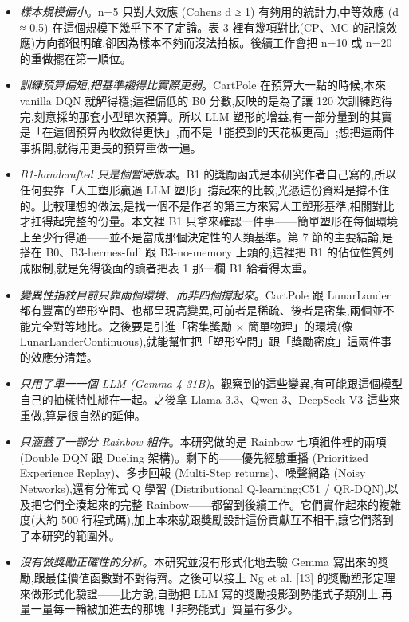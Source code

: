 \begin{itemize}
\tightlist
\item
  \emph{樣本規模偏小}。n=5 只對大效應 (Cohen\textquotesingle s d ≥ 1) 有夠用的統計力,中等效應 (d ≈ 0.5) 在這個規模下幾乎下不了定論。表 3 裡有幾項對比(CP、MC 的記憶效應)方向都很明確,卻因為樣本不夠而沒法拍板。後續工作會把 n=10 或 n=20 的重做擺在第一順位。
\item
  \emph{訓練預算偏短,把基準襯得比實際更弱}。CartPole 在預算大一點的時候,本來 vanilla DQN 就解得穩;這裡偏低的 B0 分數,反映的是為了讓 120 次訓練跑得完,刻意採的那套小型單次預算。所以 LLM 塑形的增益,有一部分量到的其實是「在這個預算內收斂得更快」,而不是「能摸到的天花板更高」;想把這兩件事拆開,就得用更長的預算重做一遍。
\item
  \emph{B1-handcrafted 只是個暫時版本}。B1 的獎勵函式是本研究作者自己寫的,所以任何要靠「人工塑形贏過 LLM 塑形」撐起來的比較,光憑這份資料是撐不住的。比較理想的做法,是找一個不是作者的第三方來寫人工塑形基準,相關對比才扛得起完整的份量。本文裡 B1 只拿來確認一件事------簡單塑形在每個環境上至少行得通------並不是當成那個決定性的人類基準。第 7 節的主要結論,是搭在 B0、B3-hermes-full 跟 B3-no-memory 上頭的;這裡把 B1 的佔位性質列成限制,就是免得後面的讀者把表 1 那一欄 B1 給看得太重。
\item
  \emph{變異性指紋目前只靠兩個環境、而非四個撐起來}。CartPole 跟 LunarLander 都有豐富的塑形空間、也都呈現高變異,可前者是稀疏、後者是密集,兩個並不能完全對等地比。之後要是引進「密集獎勵 × 簡單物理」的環境(像 LunarLanderContinuous),就能幫忙把「塑形空間」跟「獎勵密度」這兩件事的效應分清楚。
\item
  \emph{只用了單一一個 LLM (Gemma 4 31B)}。觀察到的這些變異,有可能跟這個模型自己的抽樣特性綁在一起。之後拿 Llama 3.3、Qwen 3、DeepSeek-V3 這些來重做,算是很自然的延伸。
\item
  \emph{只涵蓋了一部分 Rainbow 組件}。本研究做的是 Rainbow 七項組件裡的兩項(Double DQN 跟 Dueling 架構)。剩下的------優先經驗重播 (Prioritized Experience Replay)、多步回報 (Multi-Step returns)、噪聲網路 (Noisy Networks),還有分佈式 Q 學習 (Distributional Q-learning;C51 / QR-DQN),以及把它們全湊起來的完整 Rainbow------都留到後續工作。它們實作起來的複雜度(大約 500 行程式碼),加上本來就跟獎勵設計這份貢獻互不相干,讓它們落到了本研究的範圍外。
\item
  \emph{沒有做獎勵正確性的分析}。本研究並沒有形式化地去驗 Gemma 寫出來的獎勵,跟最佳價值函數對不對得齊。之後可以接上 Ng et al. {[}13{]} 的獎勵塑形定理來做形式化驗證------比方說,自動把 LLM 寫的獎勵投影到勢能式子類別上,再量一量每一輪被加進去的那塊「非勢能式」質量有多少。
\end{itemize}

